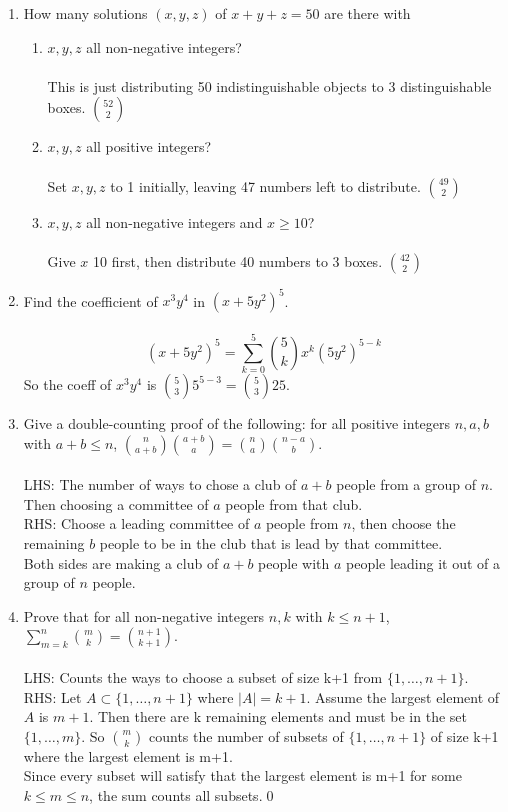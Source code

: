 \documentclass[12pt]{article}
\begin{document}
\begin{enumerate}


\item How many solutions $(x,y,z)$ of $x + y + z = 50$ are there with
\begin{enumerate}
\item $x,y,z$ all non-negative integers?\\\\
This is just distributing 50 indistinguishable objects to 3 distinguishable boxes. $\binom{52}{2}$
\item $x,y,z$ all positive integers?\\\\
Set $x,y,z$ to 1 initially, leaving 47 numbers left to distribute. $\binom{49}{2}$
\item $x,y,z$ all non-negative integers and $x \geq 10$?\\\\
Give $x$ 10 first, then distribute 40 numbers to 3 boxes. $\binom{42}{2}$

\end{enumerate}

\item Find the coefficient of $x^3y^4$ in $(x+5y^2)^5$.\\\\
\[(x+5y^2)^5 = \sum_{k=0}^{5}\binom{5}{k}x^k(5y^2)^{5-k}\]
So the coeff of $x^3y^4$ is $\binom{5}{3}5^{5-3}=\binom{5}{3}25$.

\item Give a double-counting proof of the following: for all positive integers $n,a,b$ with $a+b \leq n$, ${n \choose a+b} {a+b \choose a} = {n \choose a} {n-a \choose b}$.\\\\
LHS: The number of ways to chose a club of $a+b$ people from a group of $n$. Then choosing a committee of $a$ people from that club.\\
RHS: Choose a leading committee of $a$ people from $n$, then choose the remaining $b$ people to be in the club that is lead by that committee.\\
Both sides are making a club of $a+b$ people with $a$ people leading it out of a group of $n$ people.

\item Prove that for all non-negative integers $n,k$ with $k \leq n+1$, $\sum_{m=k}^{n} { m \choose k} = {n+1 \choose k+1}$.\\\\
LHS: Counts the ways to choose a subset of size k+1 from $\{1,\ldots,n+1\}$.
RHS: Let $A\subset\{1,\ldots,n+1\}$ where $|A|=k+1$. Assume the largest element of $A$ is $m+1$. Then there are k remaining elements and must be in the set $\{1,\ldots,m\}$. So $\binom{m}{k}$ counts the number of subsets of $\{1,\ldots,n+1\}$ of size k+1 where the largest element is m+1.\\
Since every subset will satisfy that the largest element is m+1 for some $k\leq m\leq n$, the sum counts all subsets.\qed


\end{enumerate}
\end{document}
